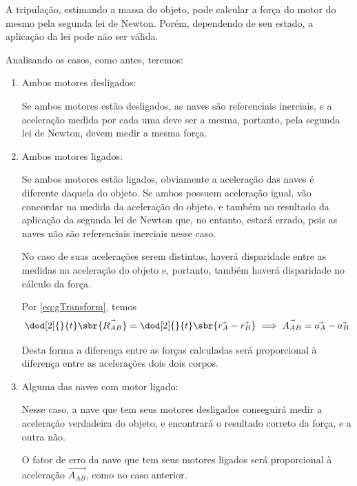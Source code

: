 \documentclass[]{IMTexam}
\begin{document}
\begin{questions}
\begin{parts}
		\begin{solution}
			A tripulação, estimando a massa do objeto, pode calcular a força do motor do mesmo pela segunda lei de Newton. Porém, dependendo de seu estado, a aplicação da lei pode não ser válida.

			Analisando os casos, como antes, teremos:

			\begin{enumerate}[label=(\roman*)]
				\item Ambos motores desligados:

				      Se ambos motores estão desligados, as naves são referenciais inerciais, e a aceleração medida por cada uma deve ser a mesma, portanto, pela segunda lei de Newton, devem medir a mesma força.

				\item Ambos motores ligados:

				      Se ambos motores estão ligados, obviamente a aceleração das naves é diferente daquela do objeto. Se ambos possuem aceleração igual, vão concordar na medida da aceleração do objeto, e também no resultado da aplicação da segunda lei de Newton que, no entanto, estará errado, pois as naves não são referenciais inerciais nesse caso.

				      No caso de suas acelerações serem distintas, haverá disparidade entre as medidas na aceleração do objeto e, portanto, também haverá disparidade no cálculo da força.

				      Por \ref{eq:gTransform}, temos
				      \[ \dod[2]{}{t}\sbr{\vec{R_{AB}}}=\dod[2]{}{t}\sbr{\vec{r_A}-\vec{r_B}}\implies \vec{A_{AB}}=\vec{a_A}-\vec{a_B} \]

				      Desta forma a diferença entre as forças calculadas será proporcional à diferença entre as acelerações dois dois corpos.

				\item Alguma das naves com motor ligado:

				      Nesse caso, a nave que tem seus motores desligados conseguirá medir a aceleração verdadeira do objeto, e encontrará o resultado correto da força, e a outra não.

				      O fator de erro da nave que tem seus motores ligados será proporcional à aceleração $ \vec{A_{AB}} $, como no caso anterior.
			\end{enumerate}
		\end{solution}
	\end{parts}




\end{questions}
\end{document}
